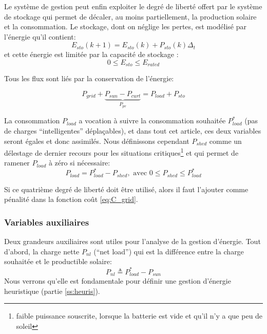 \documentclass[a4paper,10pt,twocolumn]{article}
\begin{document}
Le système de gestion peut enfin exploiter le degré de liberté offert par
le système de stockage qui permet de décaler, au moins partiellement,
la production solaire et la consommation.
Le stockage, dont on néglige les pertes, est modélisé par l'énergie qu'il contient:
%
\begin{equation}
  E_{sto}(k+1) = E_{sto}(k) + P_{sto}(k)\Delta_t
\end{equation}
%
et cette énergie est limitée par la capacité de stockage :
%
\begin{equation}
  0 \leq E_{sto} \leq E_{rated}
\end{equation}

Tous les flux sont liés par la conservation de l'énergie:

\begin{equation} \label{eq:cons}
  P_{grid} + \underbrace{P_{sun} - P_{curt}}_{P_{pv}} = P_{load} + P_{sto}
\end{equation}

La consommation $P_{load}$ a vocation à suivre la consommation souhaitée $P_{load}^*$
(pas de charges ``intelligentes'' déplaçables), et dans tout cet article, ces deux
variables seront égales et donc assimilés.
Nous définissons cependant $P_{shed}$ comme un délestage de dernier
recours pour les situations critiques\footnote{faible puissance souscrite, lorsque
la batterie est vide et qu'il n'y a que peu de soleil} et qui permet
de ramener $P_{load}$ à zéro si nécessaire:
%
\begin{equation}
  P_{load} = P_{load}^* - P_{shed}, \text{ avec } 0 \leq P_{shed} \leq P_{load}^*
\end{equation}

Si ce quatrième degré de liberté doit être utilisé,
alors il faut l'ajouter comme pénalité dans la fonction coût \eqref{eq:C_grid}.

\subsubsection{Variables auxiliaires}
\label{sss:auxi_var}

Deux grandeurs auxiliaires sont utiles pour l'analyse de la gestion d'énergie.
Tout d'abord, la charge nette $P_{nl}$ (``net load'') qui est la différence
entre la charge souhaitée et le productible solaire:
%
\begin{equation}
  P_{nl} \triangleq P_{load}^* - P_{sun}
\end{equation} 
%
Nous verrons qu'elle est fondamentale pour définir une gestion d'énergie heuristique
(partie \ref{ss:heuris}).
\end{document}

